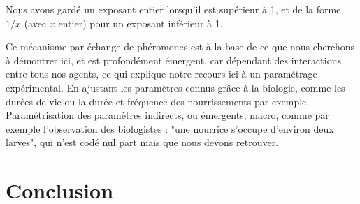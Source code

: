 	Nous avons gardé un exposant entier lorsqu'il est supérieur à 1, et de la forme $1/x$ (avec $x$ entier) pour un exposant inférieur à 1.
	
	
	Ce mécanisme par échange de phéromones est à la base de ce que nous cherchons à démontrer ici, et est profondément émergent, car dépendant des interactions entre tous nos agents, ce qui explique notre recours ici à un paramétrage expérimental. En ajustant les paramètres connus grâce à la biologie, comme les durées de vie ou la durée et fréquence des nourrissements par exemple.
			Paramétrisation des paramètres indirects, ou émergents, macro, comme par exemple l'observation des biologistes : "une nourrice s'occupe d'environ deux larves", qui n'est codé nul part mais que nous devons retrouver.
			
	\section*{Conclusion}
	